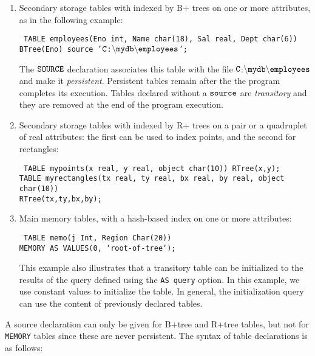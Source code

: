 \begin{enumerate}
\item Secondary storage tables with indexed by B+ trees on one or more attributes,
as in the following example:

\begin{codedisplay}
\tt
\>\> TABLE employees(Eno int, Name char(18), Sal real, Dept char(6)) \\
 \> \>  \> \> \> \> BTree(Eno)
 source '$\tt C$:$\tt \backslash  mydb \backslash employees$';\\
\end{codedisplay}

The  $\tt SOURCE$ declaration associates this table with the file
$\tt C$:$\tt \backslash  mydb \backslash employees$ and make it
 {\em persistent}. Persistent tables remain after
the the program completes its execution. Tables declared without a $\tt source$
are {\em transitory} and they are removed at the end of the program
execution.

\item Secondary storage tables with indexed by R+ trees on a pair
or a quadruplet of real attributes: the first can be
used to index points, and the second for rectangles:

\begin{codedisplay}
\tt
\>TABLE mypoints(x real, y real, object char(10)) RTree(x,y); \\[0.2cm]

\> TABLE myrectangles(tx real, ty real, bx real, by real, object char(10))\\
  \> \>  \> \> \> \>      \> \>  \> \> \> \>     RTree(tx,ty,bx,by);
\end{codedisplay}
\item
Main memory tables, with a hash-based index on one or more
attributes:
\begin{codedisplay}
\tt
TABLE memo(j Int,  Region Char(20))\\
\>\>\> MEMORY AS VALUES(0, `root-of-tree`);
\end{codedisplay}
This example also illustrates that a transitory
table can be  initialized to the results of the query defined using the
{\tt AS query} option. In this example, we use constant values to
initialize the table. In general, the initialization query can
use the content of previously declared tables.
\end{enumerate}
A source declaration can only be given for B+tree and R+tree tables, but not for
{\tt MEMORY} tables since these are never persistent.
The syntax of table declarations is as follows:


